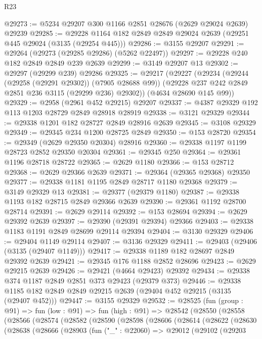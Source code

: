 \begin{lexlean}{R23}
\begin{coremodule}
@29273 := @5234 @29207 @300 @1166 @2851 @28676 (@2629 @29024 @2639) @29239
@29285 := @29228 @1164 @182 @2849 @2849 @29024 @2639 (@29251 @445 @29024 (@3135 (@29254 @445)))
@29286 := @3155 @29207
@29291 := @29264 (@29273 (@29285 @29286) (@5262 @22497))
@29297 := @29228 @240 @182 @2849 @2849 @239 @2639
@29299 := @3149 @29207 @13
@29302 := @29297 (@29299 @239) @29286
@29325 := @29217
    (@29227
      (@29234
        (@29244 (@29258 (@29291 @29302)) (@7905 @28688 @99))
        (@29228 @237 @242 @2849 @2851 @236 @3115 (@29299 @236) @29302))
      (@4634 @28690 @145 @99))
@29329 := @2958 (@2961 @452 @29215) @29207
@29337 := @4387 @29329 @192 @113 @1203 @28729 @2849 @28918 @28919
@29338 := @3121 @29329
@29344 := @29338 @1201 @182 @28727 @2849 @28916 @2639
@29345 := @3108 @29329
@29349 := @29345 @234 @1200 @28725 @2849
@29350 := @153 @28720
@29354 := @29349 (@2629 @29350 @20304) @28916
@29360 := @29338 @1197 @1199 @28723 @2852 @29350 @20304
@29361 := @29345 @250
@29364 := @29361 @1196 @28718 @28722
@29365 := @2629 @1180
@29366 := @153 @28712
@29368 := @2629 @29366 @2639
@29371 := @29364 (@29365 @29368) @29350
@29377 := @29338 @1181 @1195 @2849 @28717 @1180 @29368
@29379 := @3149 @29329 @13
@29381 := @29377 (@29379 @1180)
@29387 := @29338 @1193 @182 @28715 @2849 @29366 @2639
@29390 := @29361 @1192 @28700 @28714
@29391 := @2629 @29114
@29392 := @153 @28694
@29394 := @2629 @29392 @2639
@29397 := @29390 (@29391 @29394) @29366
@29403 := @29338 @1183 @1191 @2849 @28699 @29114 @29394
@29404 := @3130 @29329
@29406 := @29404 @1149 @29114
@29407 := @3136 @29329
@29411 := @29403 (@29406 (@3135 (@29407 @1149)))
@29417 := @29338 @1189 @182 @28697 @2849 @29392 @2639
@29421 := @29345 @176 @1188 @2852 @28696
@29423 := @2629 @29215 @2639
@29426 := @29421 (@4664 @29423) @29392
@29434 := @29338 @374 @1187 @2849 @2851 @373 @29423 (@29379 @373)
@29446 := @29338 @1185 @182 @2849 @2849 @29215 @2639 (@29404 @452 @29215 (@3135 (@29407 @452)))
@29447 := @3155 @29329
@29532 := @28525
    (fun (group : @91) =>
    fun (low : @91) =>
    fun (high : @91) =>
    @28542
      (@28550
        (@28558
          (@28566
            (@28574
              (@28582
                (@28590
                  (@28598
                    (@28606
                      (@28614
                        (@28622
                          (@28630
                            (@28638
                              (@28666
                                (@28903
                                  (fun ("_" : @22060) =>
                                  @29012
                                    (@29102
                                      (@29203

\end{coremodule}
\end{lexlean}
